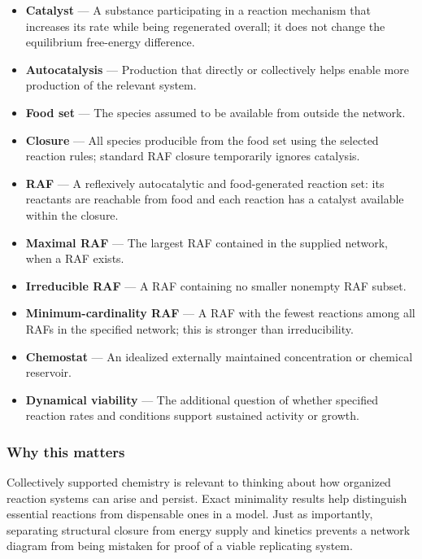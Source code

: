 \documentclass[
  11pt,
]{article}
\newcounter{none} %
\begin{document}
\begin{itemize}
\item
  \textbf{Catalyst} --- A substance participating in a reaction
  mechanism that increases its rate while being regenerated overall; it
  does not change the equilibrium free-energy difference.
\item
  \textbf{Autocatalysis} --- Production that directly or collectively
  helps enable more production of the relevant system.
\item
  \textbf{Food set} --- The species assumed to be available from outside
  the network.
\item
  \textbf{Closure} --- All species producible from the food set using
  the selected reaction rules; standard RAF closure temporarily ignores
  catalysis.
\item
  \textbf{RAF} --- A reflexively autocatalytic and food-generated
  reaction set: its reactants are reachable from food and each reaction
  has a catalyst available within the closure.
\item
  \textbf{Maximal RAF} --- The largest RAF contained in the supplied
  network, when a RAF exists.
\item
  \textbf{Irreducible RAF} --- A RAF containing no smaller nonempty RAF
  subset.
\item
  \textbf{Minimum-cardinality RAF} --- A RAF with the fewest reactions
  among all RAFs in the specified network; this is stronger than
  irreducibility.
\item
  \textbf{Chemostat} --- An idealized externally maintained
  concentration or chemical reservoir.
\item
  \textbf{Dynamical viability} --- The additional question of whether
  specified reaction rates and conditions support sustained activity or
  growth.
\end{itemize}

\subsubsection{Why this matters}

Collectively supported chemistry is relevant to thinking about how
organized reaction systems can arise and persist. Exact minimality
results help distinguish essential reactions from dispensable ones in a
model. Just as importantly, separating structural closure from energy
supply and kinetics prevents a network diagram from being mistaken for
proof of a viable replicating system.
\end{document}
